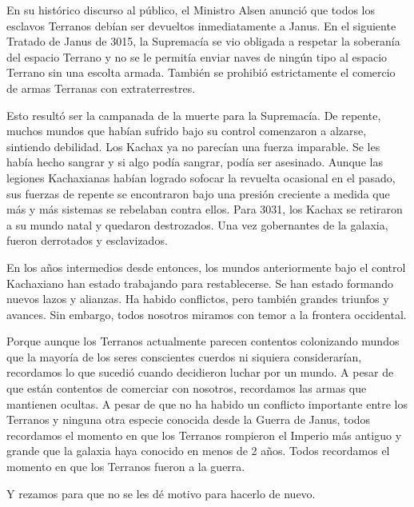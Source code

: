 \documentclass[spanish,12pt,a4paper,oneside,titlepage, twocolumn]{article}
\begin{document}
    En su histórico discurso al público, el Ministro Alsen anunció que todos los esclavos Terranos debían ser devueltos inmediatamente a Janus. En el siguiente Tratado de Janus de 3015, la Supremacía se vio obligada a respetar la soberanía del espacio Terrano y no se le permitía enviar naves de ningún tipo al espacio Terrano sin una escolta armada. También se prohibió estrictamente el comercio de armas Terranas con extraterrestres.

    Esto resultó ser la campanada de la muerte para la Supremacía. De repente, muchos mundos que habían sufrido bajo su control comenzaron a alzarse, sintiendo debilidad. Los Kachax ya no parecían una fuerza imparable. Se les había hecho sangrar y si algo podía sangrar, podía ser asesinado. Aunque las legiones Kachaxianas habían logrado sofocar la revuelta ocasional en el pasado, sus fuerzas de repente se encontraron bajo una presión creciente a medida que más y más sistemas se rebelaban contra ellos. Para 3031, los Kachax se retiraron a su mundo natal y quedaron destrozados. Una vez gobernantes de la galaxia, fueron derrotados y esclavizados.

    En los años intermedios desde entonces, los mundos anteriormente bajo el control Kachaxiano han estado trabajando para restablecerse. Se han estado formando nuevos lazos y alianzas. Ha habido conflictos, pero también grandes triunfos y avances. Sin embargo, todos nosotros miramos con temor a la frontera occidental.

    Porque aunque los Terranos actualmente parecen contentos colonizando mundos que la mayoría de los seres conscientes cuerdos ni siquiera considerarían, recordamos lo que sucedió cuando decidieron luchar por un mundo. A pesar de que están contentos de comerciar con nosotros, recordamos las armas que mantienen ocultas. A pesar de que no ha habido un conflicto importante entre los Terranos y ninguna otra especie conocida desde la Guerra de Janus, todos recordamos el momento en que los Terranos rompieron el Imperio más antiguo y grande que la galaxia haya conocido en menos de 2 años. Todos recordamos el momento en que los Terranos fueron a la guerra.

    Y rezamos para que no se les dé motivo para hacerlo de nuevo.
\end{document}
